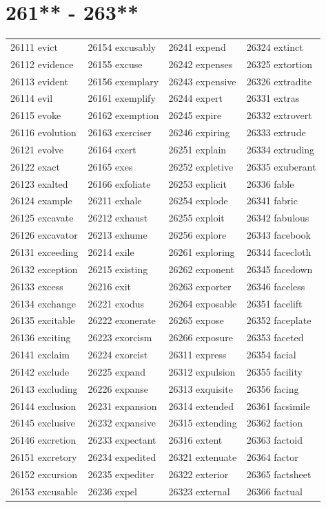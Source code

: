 \documentclass[10pt, oneside]{book}
\begin{document}
\begin{table}
	\centering
	\section*{261** - 263**}
	\begin{tabular}{l l l l}
26111 evict &26154 excusably &26241 expend &26324 extinct\\
26112 evidence &26155 excuse &26242 expenses &26325 extortion\\
26113 evident &26156 exemplary &26243 expensive &26326 extradite\\
26114 evil &26161 exemplify &26244 expert &26331 extras\\
26115 evoke &26162 exemption &26245 expire &26332 extrovert\\
26116 evolution &26163 exerciser &26246 expiring &26333 extrude\\
26121 evolve &26164 exert &26251 explain &26334 extruding\\
26122 exact &26165 exes &26252 expletive &26335 exuberant\\
26123 exalted &26166 exfoliate &26253 explicit &26336 fable\\
26124 example &26211 exhale &26254 explode &26341 fabric\\
26125 excavate &26212 exhaust &26255 exploit &26342 fabulous\\
26126 excavator &26213 exhume &26256 explore &26343 facebook\\
26131 exceeding &26214 exile &26261 exploring &26344 facecloth\\
26132 exception &26215 existing &26262 exponent &26345 facedown\\
26133 excess &26216 exit &26263 exporter &26346 faceless\\
26134 exchange &26221 exodus &26264 exposable &26351 facelift\\
26135 excitable &26222 exonerate &26265 expose &26352 faceplate\\
26136 exciting &26223 exorcism &26266 exposure &26353 faceted\\
26141 exclaim &26224 exorcist &26311 express &26354 facial\\
26142 exclude &26225 expand &26312 expulsion &26355 facility\\
26143 excluding &26226 expanse &26313 exquisite &26356 facing\\
26144 exclusion &26231 expansion &26314 extended &26361 facsimile\\
26145 exclusive &26232 expansive &26315 extending &26362 faction\\
26146 excretion &26233 expectant &26316 extent &26363 factoid\\
26151 excretory &26234 expedited &26321 extenuate &26364 factor\\
26152 excursion &26235 expediter &26322 exterior &26365 factsheet\\
26153 excusable &26236 expel &26323 external &26366 factual\\
	\end{tabular}
 \end{table}
\clearpage
\end{document}
